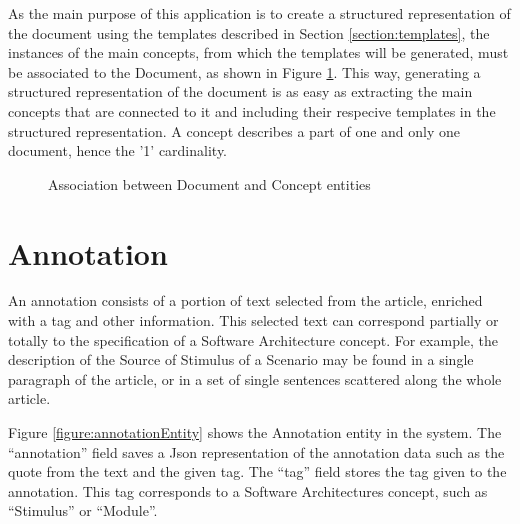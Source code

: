 As the main purpose of this application is to create a structured representation of the document using the templates described in Section \ref{section:templates}, the instances of the main concepts, from which the templates will be generated, must be associated to the Document, as shown in Figure \ref{figure:documentConcept}. This way, generating a structured representation of the document is as easy as extracting the main concepts that are connected to it and including their respecive templates in the structured representation. A concept describes a part of one and only one document, hence the '1' cardinality.  

\begin{figure}[h]
\centering
\renewcommand {\umltextcolor}{black}
\renewcommand {\umlfillcolor}{none}
\renewcommand {\umldrawcolor}{black}

\caption{Association between Document and Concept entities}
\label{figure:documentConcept}
\end{figure}

\section{Annotation}
\label{section:annotation}

An annotation consists of a portion of text selected from the article, enriched with a tag and other information. This selected text can correspond partially or totally to the specification of a Software Architecture concept. For example, the description of the Source of Stimulus of a Scenario may be found in a single paragraph of the article, or in a set of single sentences scattered along the whole article. 

Figure \ref{figure:annotationEntity} shows the Annotation entity in the system. The ``annotation'' field saves a Json representation of the annotation data such as the quote from the text and the given tag. The ``tag'' field stores the tag given to the annotation. This tag corresponds to a Software Architectures concept, such as ``Stimulus'' or ``Module''.

